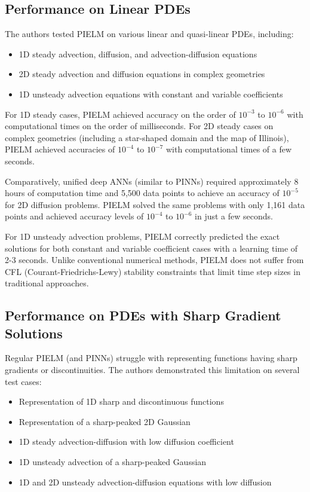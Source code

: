 \documentclass[11pt]{article}
\begin{document}
\subsection{Performance on Linear PDEs}

The authors tested PIELM on various linear and quasi-linear PDEs, including:
\begin{itemize}
    \item 1D steady advection, diffusion, and advection-diffusion equations
    \item 2D steady advection and diffusion equations in complex geometries
    \item 1D unsteady advection equations with constant and variable coefficients
\end{itemize}

For 1D steady cases, PIELM achieved accuracy on the order of $10^{-3}$ to $10^{-6}$ with computational times on the order of milliseconds. For 2D steady cases on complex geometries (including a star-shaped domain and the map of Illinois), PIELM achieved accuracies of $10^{-4}$ to $10^{-7}$ with computational times of a few seconds.

Comparatively, unified deep ANNs (similar to PINNs) required approximately 8 hours of computation time and 5,500 data points to achieve an accuracy of $10^{-5}$ for 2D diffusion problems. PIELM solved the same problems with only 1,161 data points and achieved accuracy levels of $10^{-4}$ to $10^{-6}$ in just a few seconds.

For 1D unsteady advection problems, PIELM correctly predicted the exact solutions for both constant and variable coefficient cases with a learning time of 2-3 seconds. Unlike conventional numerical methods, PIELM does not suffer from CFL (Courant-Friedrichs-Lewy) stability constraints that limit time step sizes in traditional approaches.

\subsection{Performance on PDEs with Sharp Gradient Solutions}

Regular PIELM (and PINNs) struggle with representing functions having sharp gradients or discontinuities. The authors demonstrated this limitation on several test cases:
\begin{itemize}
    \item Representation of 1D sharp and discontinuous functions
    \item Representation of a sharp-peaked 2D Gaussian
    \item 1D steady advection-diffusion with low diffusion coefficient
    \item 1D unsteady advection of a sharp-peaked Gaussian
    \item 1D and 2D unsteady advection-diffusion equations with low diffusion
\end{itemize}
\end{document}
